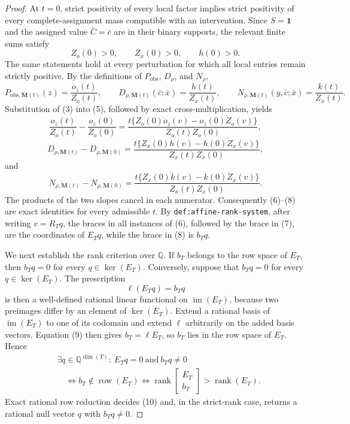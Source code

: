 \documentclass{article}
\begin{document}
\begin{proof}
At \(t=0\), strict positivity of every local factor implies strict positivity of every complete-assignment mass compatible with an intervention.  Since \(S=\mathbf 1\) and the assigned value \(\bar C=\bar c\) are in their binary supports, the relevant finite sums satisfy
\[
 Z_o(0)>0,\qquad Z_x(0)>0,\qquad h(0)>0.                       \tag{4}
\]
The same statements hold at every perturbation for which all local entries remain strictly positive.  By the definitions of \(P_{\mathrm{obs}}\), \(D_\rho\), and \(N_\rho\),
\[
 P_{\mathrm{obs},\mathbf M(t)}(z)=\frac{o_z(t)}{Z_o(t)},\qquad
 D_{\rho,\mathbf M(t)}(\bar c;\bar x)=\frac{h(t)}{Z_x(t)},
 \qquad
 N_{\rho,\mathbf M(t)}(y,\bar c;\bar x)=\frac{k(t)}{Z_x(t)}. \tag{5}
\]
Substitution of (3) into (5), followed by exact cross-multiplication, yields
\[
 \frac{o_z(t)}{Z_o(t)}-\frac{o_z(0)}{Z_o(0)}
 =\frac{t\{Z_o(0)\dot o_z(v)-o_z(0)\dot Z_o(v)\}}
        {Z_o(t)Z_o(0)},                                        \tag{6}
\]
\[
 D_{\rho,\mathbf M(t)}-D_{\rho,\mathbf M(0)}
 =\frac{t\{Z_x(0)\dot h(v)-h(0)\dot Z_x(v)\}}
        {Z_x(t)Z_x(0)},                                        \tag{7}
\]
and
\[
 N_{\rho,\mathbf M(t)}-N_{\rho,\mathbf M(0)}
 =\frac{t\{Z_x(0)\dot k(v)-k(0)\dot Z_x(v)\}}
        {Z_x(t)Z_x(0)}.                                        \tag{8}
\]
The products of the two slopes cancel in each numerator.  Consequently (6)--(8) are exact identities for every admissible \(t\).  By \texttt{def:affine-rank-system}, after writing \(v=R_Tq\), the braces in all instances of (6), followed by the brace in (7), are the coordinates of \(E_Tq\), while the brace in (8) is \(b_Tq\).

We next establish the rank criterion over \(\mathbb Q\).  If \(b_T\) belongs to the row space of \(E_T\), then \(b_Tq=0\) for every \(q\in\ker(E_T)\).  Conversely, suppose that \(b_Tq=0\) for every \(q\in\ker(E_T)\).  The prescription
\[
 \ell(E_Tq)=b_Tq                                                \tag{9}
\]
is then a well-defined rational linear functional on \(\operatorname{im}(E_T)\), because two preimages differ by an element of \(\ker(E_T)\).  Extend a rational basis of \(\operatorname{im}(E_T)\) to one of its codomain and extend \(\ell\) arbitrarily on the added basis vectors.  Equation (9) then gives \(b_T=\ell E_T\), so \(b_T\) lies in the row space of \(E_T\).  Hence
\[
\begin{aligned}
 &\exists q\in\mathbb Q^{\dim(T)}:\ E_Tq=0\ \text{and}\ b_Tq\ne0\\
 &\quad\Longleftrightarrow b_T\notin\operatorname{row}(E_T)
 \Longleftrightarrow
 \operatorname{rank}\!\begin{bmatrix}E_T\\ b_T\end{bmatrix}
 >\operatorname{rank}(E_T).                                    \tag{10}
\end{aligned}
\]
Exact rational row reduction decides (10) and, in the strict-rank case, returns a rational null vector \(q\) with \(b_Tq\ne0\).


\end{proof}
\end{document}
